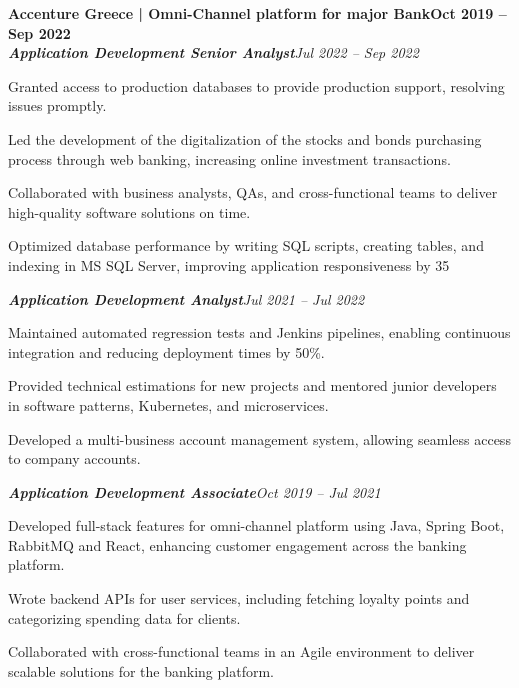 \documentclass[letterpaper,10pt]{article}
\newcommand{\heading}[2]{
  \hspace{10pt}#1\hfill#2\\
}
\newcommand{\headingBf}[2]{
  \heading{\textbf{#1}}{\textbf{#2}}
}
\newcommand{\headingIt}[2]{
  \heading{\textit{#1}}{\textit{#2}}
}
\newenvironment{resume_list}{
  \vspace{-7pt}
  \begin{itemize}[itemsep=-2px, parsep=1pt, leftmargin=30pt]
}{
  \end{itemize}
}
\begin{document}
\headingBf{\Large Accenture Greece | Omni-Channel platform for major Bank}{Oct 2019 -- Sep 2022}
\headingIt{\large \textbf{Application Development Senior Analyst}}{Jul 2022 -- Sep 2022}
\begin{resume_list}
    \item Granted access to production databases to provide production support, resolving issues promptly.
    \item Led the development of the digitalization of the stocks and bonds purchasing process through web banking, increasing online investment transactions.
    \item Collaborated with business analysts, QAs, and cross-functional teams to deliver high-quality software solutions on time.
    \item Optimized database performance by writing SQL scripts, creating tables, and indexing in MS SQL Server, improving
application responsiveness by 35%
\end{resume_list}

\headingIt{\large \textbf{Application Development Analyst}}{Jul 2021 -- Jul 2022}
\begin{resume_list}
    \item Maintained automated regression tests and Jenkins pipelines, enabling continuous integration and reducing deployment times by 50\%.
    \item Provided technical estimations for new projects and mentored junior developers in software patterns, Kubernetes, and microservices.
    \item Developed a multi-business account management system, allowing seamless access to company accounts.
\end{resume_list}

 \headingIt{\large \textbf{Application Development Associate}}{Oct 2019 -- Jul 2021}
\begin{resume_list}
    \item Developed full-stack features for omni-channel platform using Java, Spring Boot, RabbitMQ and React, enhancing customer engagement across the banking platform.
    \item Wrote backend APIs for user services, including fetching loyalty points and categorizing spending data for clients.
    \item Collaborated with cross-functional teams in an Agile environment to deliver scalable solutions for the banking platform.
\end{resume_list}
\end{document}

